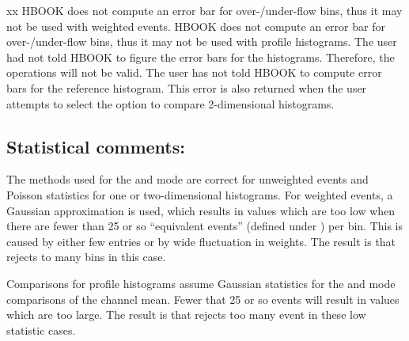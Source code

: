 \begin{DLtt}{xx}
    HBOOK does not compute an error bar for over-/under-flow bins, 
    thus it may not be used with weighted events.
    HBOOK  does not compute an error bar for over-/under-flow bins, 
    thus it may not be used with profile histograms.
    The user had not told HBOOK to figure the error bars for the histograms.
    Therefore, the operations will not be valid.
    The user has not told HBOOK to compute error bars for the reference
    histogram. 
    This error is also returned when the user attempts to select
    the  option to compare 2-dimensional histograms.
\end{DLtt}

\subsection*{Statistical comments:}

The methods used for the  and  mode are correct for unweighted events and
Poisson statistics for one or two-dimensional histograms.  
For weighted events,
a Gaussian approximation is used, which results in  values which are
too low when there are fewer than 25 or so ``equivalent events'' (defined
under ) per bin.  
This is caused by either few entries or by wide fluctuation in weights.  
The result is that  rejects to many bins in this case.

Comparisons for profile histograms assume Gaussian statistics
for the  and  mode comparisons of the channel mean.  
Fewer that 25 or so events will result in  values which are too large.  
The result is that  rejects too many event in these low statistic cases.

